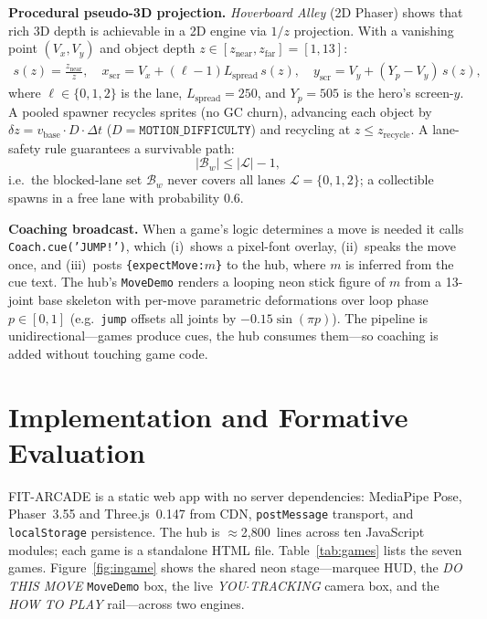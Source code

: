 \documentclass[runningheads]{llncs}
\newcommand{\sys}{\textsc{FIT-ARCADE}}
\newcommand{\postmsg}{\texttt{postMessage}}
\begin{document}
\textbf{Procedural pseudo-3D projection.} \emph{Hoverboard Alley} (2D Phaser) shows that
rich 3D depth is achievable in a 2D engine via $1/z$ projection. With a vanishing point
$(V_x,V_y)$ and object depth $z\in[z_{\text{near}},z_{\text{far}}]=[1,13]$:
\begin{align}
  s(z)=\tfrac{z_{\text{near}}}{z},\quad
  x_{\text{scr}}=V_x+(\ell-1)L_{\text{spread}}\,s(z),\quad
  y_{\text{scr}}=V_y+(Y_{p}-V_y)\,s(z),
  \label{eq:proj}
\end{align}
where $\ell\in\{0,1,2\}$ is the lane, $L_{\text{spread}}=250$, and $Y_p=505$ is the
hero's screen-$y$. A pooled spawner recycles sprites (no GC churn), advancing each object
by $\delta z=v_{\text{base}}\cdot D\cdot\Delta t$ ($D=\texttt{MOTION\_DIFFICULTY}$) and
recycling at $z\le z_{\text{recycle}}$. A lane-safety rule guarantees a survivable path:
\begin{equation}
  |\mathcal{B}_w|\le|\mathcal{L}|-1,
  \label{eq:lanesafe}
\end{equation}
i.e.\ the blocked-lane set $\mathcal{B}_w$ never covers all lanes
$\mathcal{L}=\{0,1,2\}$; a collectible spawns in a free lane with probability $0.6$.

\textbf{Coaching broadcast.} When a game's logic determines a move is needed it calls
\texttt{Coach.cue('JUMP!')}, which (i)~shows a pixel-font overlay, (ii)~speaks the move
once, and (iii)~posts \texttt{\{expectMove:$m$\}} to the hub, where $m$ is inferred from
the cue text. The hub's \texttt{MoveDemo} renders a looping neon stick figure of $m$ from
a 13-joint base skeleton with per-move parametric deformations over loop phase
$p\in[0,1]$ (e.g.\ \texttt{jump} offsets all joints by $-0.15\sin(\pi p)$). The pipeline is
unidirectional---games produce cues, the hub consumes them---so coaching is added without
touching game code.

\section{Implementation and Formative Evaluation}\label{sec:eval}
\sys{} is a static web app with no server dependencies: MediaPipe Pose, Phaser~3.55 and
Three.js~0.147 from CDN, \postmsg{} transport, and \texttt{localStorage} persistence.
The hub is $\approx$2{,}800~lines across ten JavaScript modules; each game is a standalone
HTML file. Table~\ref{tab:games} lists the seven games. Figure~\ref{fig:ingame} shows the
shared neon stage---marquee HUD, the \emph{DO THIS MOVE} \texttt{MoveDemo} box, the live
\emph{YOU$\cdot$TRACKING} camera box, and the \emph{HOW TO PLAY} rail---across two engines.
\end{document}
